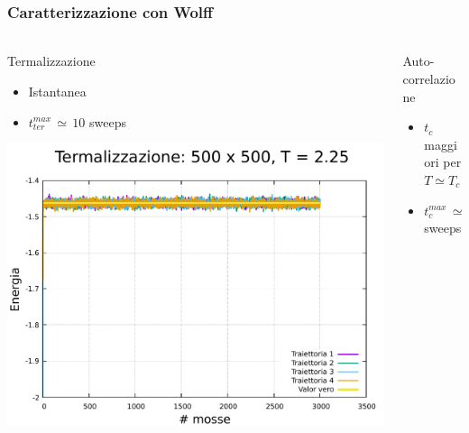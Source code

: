 \begin{frame}
    \frametitle{Caratterizzazione con Wolff}
    \framesubtitle{}

    \begin{columns}
        \begin{column}{0.33\textwidth}
            \begin{block}{Termalizzazione}

                \begin{itemize}[itemsep=0.5em, label=$\diamond$]
                    \item Istantanea
                    \item $t_{ter}^{max}\,\simeq\,10$ sweeps
                \end{itemize}

                \vspace{0.5cm}

                \centering
                \includegraphics[width=\textwidth]{Immagini/simIsing2D/termW_500_2.25.pdf}
            
            \end{block}
        \end{column}
    
        \begin{column}{0.33\textwidth}
            \begin{block}{Auto-correlazione}

                \begin{itemize}[itemsep=0.5em, label=$\diamond$]
                    \item $t_{c}$ maggiori per $T \simeq T_c$
                    \item $t_{c}^{max}\,\simeq\,40$ sweeps
                \end{itemize}


\end{block}
\end{column}
\end{columns}
\end{frame}
